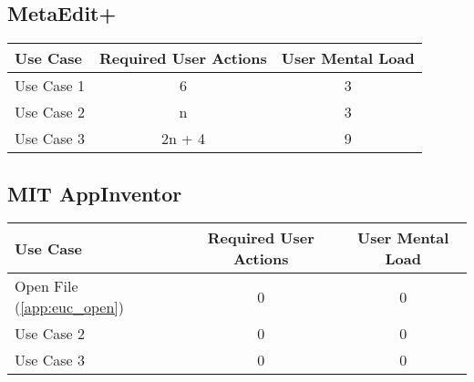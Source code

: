 \subsection{MetaEdit+}




\begin{tabularx}{\textwidth}{Xcc}
\textbf{Use Case} & \textbf{Required User Actions} & \textbf{User Mental Load}\\
\hline
Use Case 1                          & 6 & 3 \\
Use Case 2                          & n & 3 \\
Use Case 3                          & 2n + 4 & 9
\end{tabularx}

\subsection{MIT AppInventor}

\begin{tabularx}{\textwidth}{Xcc}
\textbf{Use Case} & \textbf{Required User Actions} & \textbf{User Mental Load}\\
\hline
Open File (\ref{app:euc_open}) & 0 & 0 \\
Use Case 2                     & 0 & 0 \\
Use Case 3                     & 0 & 0
\end{tabularx}

